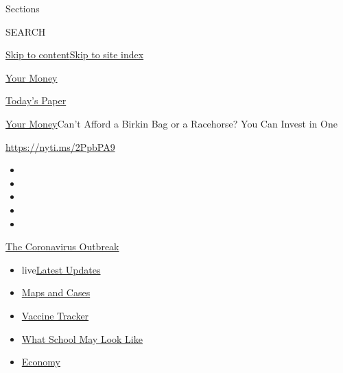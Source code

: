 Sections

SEARCH

\protect\hyperlink{site-content}{Skip to
content}\protect\hyperlink{site-index}{Skip to site index}

\href{https://www.nytimes3xbfgragh.onion/section/your-money}{Your Money}

\href{https://myaccount.nytimes3xbfgragh.onion/auth/login?response_type=cookie\&client_id=vi}{}

\href{https://www.nytimes3xbfgragh.onion/section/todayspaper}{Today's
Paper}

\href{/section/your-money}{Your Money}\textbar{}Can't Afford a Birkin
Bag or a Racehorse? You Can Invest in One

\url{https://nyti.ms/2PpbPA9}

\begin{itemize}
\item
\item
\item
\item
\item
\end{itemize}

\href{https://www.nytimes3xbfgragh.onion/news-event/coronavirus?action=click\&pgtype=Article\&state=default\&region=TOP_BANNER\&context=storylines_menu}{The
Coronavirus Outbreak}

\begin{itemize}
\tightlist
\item
  live\href{https://www.nytimes3xbfgragh.onion/2020/08/01/world/coronavirus-covid-19.html?action=click\&pgtype=Article\&state=default\&region=TOP_BANNER\&context=storylines_menu}{Latest
  Updates}
\item
  \href{https://www.nytimes3xbfgragh.onion/interactive/2020/us/coronavirus-us-cases.html?action=click\&pgtype=Article\&state=default\&region=TOP_BANNER\&context=storylines_menu}{Maps
  and Cases}
\item
  \href{https://www.nytimes3xbfgragh.onion/interactive/2020/science/coronavirus-vaccine-tracker.html?action=click\&pgtype=Article\&state=default\&region=TOP_BANNER\&context=storylines_menu}{Vaccine
  Tracker}
\item
  \href{https://www.nytimes3xbfgragh.onion/interactive/2020/07/29/us/schools-reopening-coronavirus.html?action=click\&pgtype=Article\&state=default\&region=TOP_BANNER\&context=storylines_menu}{What
  School May Look Like}
\item
  \href{https://www.nytimes3xbfgragh.onion/live/2020/07/31/business/stock-market-today-coronavirus?action=click\&pgtype=Article\&state=default\&region=TOP_BANNER\&context=storylines_menu}{Economy}
\end{itemize}

